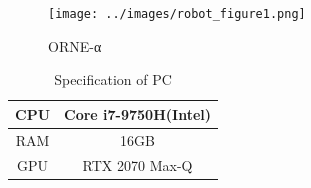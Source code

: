 \documentclass[../main]{subfiles}
\begin{document}
        \begin{figure}[H]
        \centering
        \texttt{[image: ../images/robot\_figure1.png]}
        \caption{ORNE-α}
        \label{figure::robot_image}
        \end{figure}

        \begin{table}[H]
         \centering
         \caption{Specification of PC}
         \begin{tabular}{l|l} \hline
         \multicolumn{1}{c|}{CPU} & \multicolumn{1}{c}{Core i7-9750H(Intel)} \\ \hline
         \multicolumn{1}{c|}{RAM} & \multicolumn{1}{c}{16GB} \\ \hline
         \multicolumn{1}{c|}{GPU} & \multicolumn{1}{c}{RTX 2070 Max-Q} \\ \hline
         \end{tabular}
         \label{table::pc_spec}
        \end{table}
\end{document}

